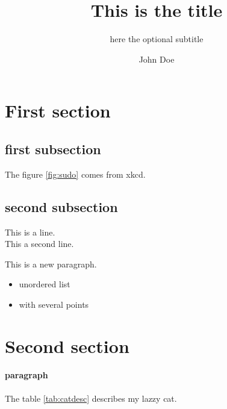 \documentclass[a4paper,11pt]{article}
\title{This is the title}
\subtitle{here the optional subtitle}
\author{John Doe}
\begin{document}

\newpage
\thispagestyle{empty}
\tableofcontents
\listoffigures
\listoftables
\newpage

\section{First section}
\subsection{first subsection}

The figure \ref{fig:sudo} comes from xkcd.

\subsection{second subsection}
This is a line.\\
This a second line.

\bigskip
This is a new paragraph.
\begin{itemize}
    \item unordered list
    \item with several points
\end{itemize}

\section{Second section}

\paragraph*{paragraph}


The table \ref{tab:catdesc} describes my lazzy cat.


%
%
\end{document}
